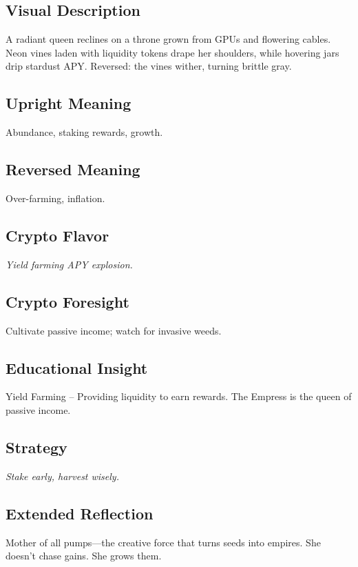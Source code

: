 \documentclass[11pt,oneside]{book}
\begin{document}
\begin{minipage}[t]{0.55\textwidth}
  \vspace{0pt}

  \subsection*{Visual Description}
  A radiant queen reclines on a throne grown from GPUs and flowering cables. Neon vines laden with liquidity tokens drape her shoulders, while hovering jars drip stardust APY. Reversed: the vines wither, turning brittle gray.

  \subsection*{Upright Meaning}
  Abundance, staking rewards, growth.

  \subsection*{Reversed Meaning}
  Over-farming, inflation.

  \subsection*{Crypto Flavor}
  \textit{Yield farming APY explosion.}

  \subsection*{Crypto Foresight}
  Cultivate passive income; watch for invasive weeds.

  \subsection*{Educational Insight}
  Yield Farming – Providing liquidity to earn rewards. The Empress is the queen of passive income.

  \subsection*{Strategy}
  \textit{Stake early, harvest wisely.}

  \subsection*{Extended Reflection}
  Mother of all pumps—the creative force that turns seeds into empires. She doesn't chase gains. She grows them.


\end{minipage}
\end{document}
